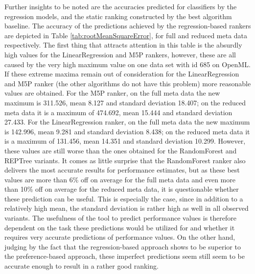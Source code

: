 Further insights to be noted are the accuracies predicted for classifiers by the regression models, and the static ranking constructed by the best algorithm baseline. The accuracy of the predictions achieved by the regression-based rankers are depicted in Table \ref{tab:rootMeanSquareError}, for full and reduced meta data respectively. The first thing that attracts attention in this table is the absurdly high values for the LinearRegression and M5P rankers, however, these are all caused by the very high maximum value on one data set with id 685 on OpenML. If these extreme maxima remain out of consideration for the LinearRegression and M5P ranker (the other algorithms do not have this problem) more reasonable values are obtained. For the M5P ranker, on the full meta data the new maximum is 311.526, mean 8.127 and standard deviation 18.407; on the reduced meta data it is a maximum of 474.692, mean 15.444 and standard deviation 27.433. For the LinearRegression ranker, on the full meta data the new maximum is 142.996, mean 9.281 and standard deviation 8.438; on the reduced meta data it is a maximum of 131.456, mean 14.351 and standard deviation 10.299. However, these values are still worse than the ones obtained for the RandomForest and REPTree variants. It comes as little surprise that the RandomForest ranker also delivers the most accurate results for performance estimates, but as these best values are more than 6\% off on average for the full meta data and even more than 10\% off on average for the reduced meta data, it is questionable whether these prediction can be useful. This is especially the case, since in addition to a relatively high mean, the standard deviation is rather high as well in all observed variants. The usefulness of the tool to predict performance values is therefore dependent on the task these predictions would be utilized for and whether it requires very accurate predictions of performance values. On the other hand, judging by the fact that the regression-based approach shows to be superior to the preference-based approach, these imperfect predictions seem still seem to be accurate enough to result in a rather good ranking.



